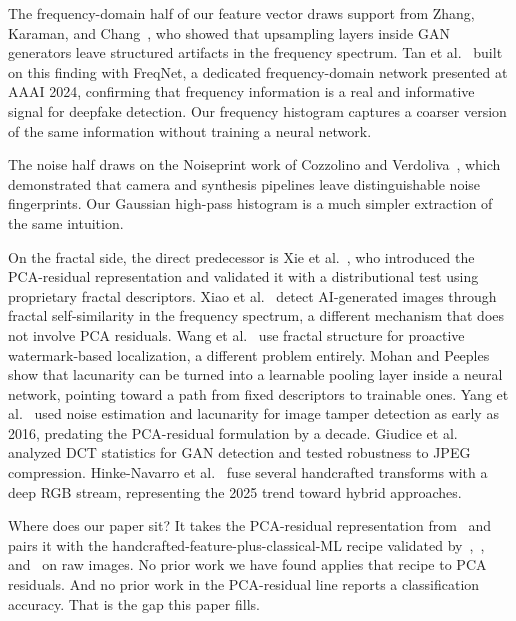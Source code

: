 \documentclass[runningheads]{llncs}
\begin{document}
The frequency-domain half of our feature vector draws support from Zhang, Karaman, and Chang~\cite{zhang2019}, who showed that upsampling layers inside GAN generators leave structured artifacts in the frequency spectrum. Tan et al.~\cite{tan2024} built on this finding with FreqNet, a dedicated frequency-domain network presented at AAAI 2024, confirming that frequency information is a real and informative signal for deepfake detection. Our frequency histogram captures a coarser version of the same information without training a neural network.

The noise half draws on the Noiseprint work of Cozzolino and Verdoliva~\cite{cozzolino2018}, which demonstrated that camera and synthesis pipelines leave distinguishable noise fingerprints. Our Gaussian high-pass histogram is a much simpler extraction of the same intuition.

On the fractal side, the direct predecessor is Xie et al.~\cite{xie2026}, who introduced the PCA-residual representation and validated it with a distributional test using proprietary fractal descriptors. Xiao et al.~\cite{xiao2025} detect AI-generated images through fractal self-similarity in the frequency spectrum, a different mechanism that does not involve PCA residuals. Wang et al.~\cite{wang2025} use fractal structure for proactive watermark-based localization, a different problem entirely. Mohan and Peeples~\cite{mohan2024} show that lacunarity can be turned into a learnable pooling layer inside a neural network, pointing toward a path from fixed descriptors to trainable ones. Yang et al.~\cite{yang2016} used noise estimation and lacunarity for image tamper detection as early as 2016, predating the PCA-residual formulation by a decade. Giudice et al.~\cite{giudice2021} analyzed DCT statistics for GAN detection and tested robustness to JPEG compression. Hinke-Navarro et al.~\cite{hinke2025} fuse several handcrafted transforms with a deep RGB stream, representing the 2025 trend toward hybrid approaches.

Where does our paper sit? It takes the PCA-residual representation from~\cite{xie2026} and pairs it with the handcrafted-feature-plus-classical-ML recipe validated by~\cite{yasir2025},~\cite{nirob2026}, and~\cite{chaudhari2026} on raw images. No prior work we have found applies that recipe to PCA residuals. And no prior work in the PCA-residual line reports a classification accuracy. That is the gap this paper fills.


\end{document}
